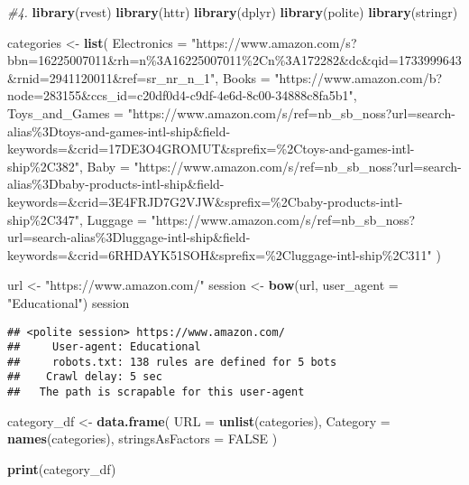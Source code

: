 \documentclass[
]{article}
\newenvironment{Shaded}{\begin{snugshade}}{\end{snugshade}}
\newcommand{\AttributeTok}[1]{\textcolor[rgb]{0.13,0.29,0.53}{#1}}
\newcommand{\CommentTok}[1]{\textcolor[rgb]{0.56,0.35,0.01}{\textit{#1}}}
\newcommand{\ConstantTok}[1]{\textcolor[rgb]{0.56,0.35,0.01}{#1}}
\newcommand{\FunctionTok}[1]{\textcolor[rgb]{0.13,0.29,0.53}{\textbf{#1}}}
\newcommand{\NormalTok}[1]{#1}
\newcommand{\OtherTok}[1]{\textcolor[rgb]{0.56,0.35,0.01}{#1}}
\newcommand{\StringTok}[1]{\textcolor[rgb]{0.31,0.60,0.02}{#1}}
\begin{document}
\begin{Shaded}
\begin{Highlighting}[]
\CommentTok{\#4. }
\FunctionTok{library}\NormalTok{(rvest)}
\FunctionTok{library}\NormalTok{(httr)}
\FunctionTok{library}\NormalTok{(dplyr)}
\FunctionTok{library}\NormalTok{(polite)}
\FunctionTok{library}\NormalTok{(stringr)}



\NormalTok{categories }\OtherTok{\textless{}{-}} \FunctionTok{list}\NormalTok{(}
  \AttributeTok{Electronics =} \StringTok{"https://www.amazon.com/s?bbn=16225007011\&rh=n\%3A16225007011\%2Cn\%3A172282\&dc\&qid=1733999643\&rnid=2941120011\&ref=sr\_nr\_n\_1"}\NormalTok{,}
  \AttributeTok{Books =} \StringTok{"https://www.amazon.com/b?node=283155\&ccs\_id=c20df0d4{-}c9df{-}4e6d{-}8c00{-}34888c8fa5b1"}\NormalTok{,}
  \AttributeTok{Toys\_and\_Games =} \StringTok{"https://www.amazon.com/s/ref=nb\_sb\_noss?url=search{-}alias\%3Dtoys{-}and{-}games{-}intl{-}ship\&field{-}keywords=\&crid=17DE3O4GROMUT\&sprefix=\%2Ctoys{-}and{-}games{-}intl{-}ship\%2C382"}\NormalTok{,}
  \AttributeTok{Baby =} \StringTok{"https://www.amazon.com/s/ref=nb\_sb\_noss?url=search{-}alias\%3Dbaby{-}products{-}intl{-}ship\&field{-}keywords=\&crid=3E4FRJD7G2VJW\&sprefix=\%2Cbaby{-}products{-}intl{-}ship\%2C347"}\NormalTok{,}
  \AttributeTok{Luggage =} \StringTok{"https://www.amazon.com/s/ref=nb\_sb\_noss?url=search{-}alias\%3Dluggage{-}intl{-}ship\&field{-}keywords=\&crid=6RHDAYK51SOH\&sprefix=\%2Cluggage{-}intl{-}ship\%2C311"}
\NormalTok{)}


\NormalTok{url }\OtherTok{\textless{}{-}} \StringTok{"https://www.amazon.com/"}
\NormalTok{session }\OtherTok{\textless{}{-}} \FunctionTok{bow}\NormalTok{(url, }
               \AttributeTok{user\_agent =} \StringTok{"Educational"}\NormalTok{)}
\NormalTok{session}
\end{Highlighting}
\end{Shaded}

\begin{verbatim}
## <polite session> https://www.amazon.com/
##     User-agent: Educational
##     robots.txt: 138 rules are defined for 5 bots
##    Crawl delay: 5 sec
##   The path is scrapable for this user-agent
\end{verbatim}

\begin{Shaded}
\begin{Highlighting}[]
\NormalTok{category\_df }\OtherTok{\textless{}{-}} \FunctionTok{data.frame}\NormalTok{(}
  \AttributeTok{URL =} \FunctionTok{unlist}\NormalTok{(categories),}
  \AttributeTok{Category =} \FunctionTok{names}\NormalTok{(categories),}
  \AttributeTok{stringsAsFactors =} \ConstantTok{FALSE}
\NormalTok{)}

\FunctionTok{print}\NormalTok{(category\_df)}
\end{Highlighting}
\end{Shaded}
\end{document}
